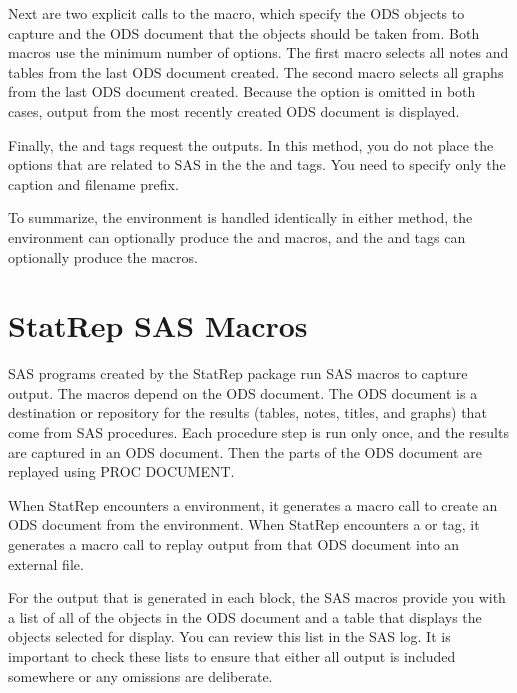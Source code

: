 \documentclass[article,oneside]{memoir}
\newcommand*{\StatRep}{\textsf{StatRep}\xspace}
\begin{document}
  Next are two explicit calls to the  macro, which
  specify the ODS objects to capture and the ODS document that the objects
  should be taken from.
  Both  macros use the minimum number of options.
  The first  macro selects all
  notes and tables from the last ODS document created. The second  macro
  selects all graphs from the last ODS document created.
  Because the  option is omitted in both cases,
  output from the most recently created ODS document is displayed.

  Finally, the  and  tags request the outputs.
  In
  this method, you do not place the options that are related to SAS in the
  the  and  tags. You need to
  specify only the caption and filename prefix.


  To summarize, the  environment is handled identically in either method,
  the  environment can optionally produce the  and  macros,
  and the  and  tags can optionally produce the  macros.

\section{\StatRep SAS Macros}\label{macros}
  SAS programs created by the \StatRep package
  run SAS macros to capture output. The macros depend on the ODS document.
  The ODS document is a destination or repository for the results
  (tables, notes, titles, and graphs)
  that come from SAS procedures. Each procedure step is run only once,
  and the results are captured in an ODS document.
  Then the parts of the ODS document are replayed using PROC DOCUMENT.

  When \StatRep encounters a  environment,
  it generates a macro call to create an ODS document from the environment.
  When \StatRep encounters a  or  tag,
  it generates a macro call to replay output from that ODS document into an external file.

  For the output that is generated in each  block, the SAS macros provide you
  with a list of all
  of the objects in the ODS document and a table that displays
  the objects selected for display. You can
  review this list in the SAS log.
  It is important to check these lists to ensure that either all output
  is included somewhere or any omissions are deliberate.
\end{document}
